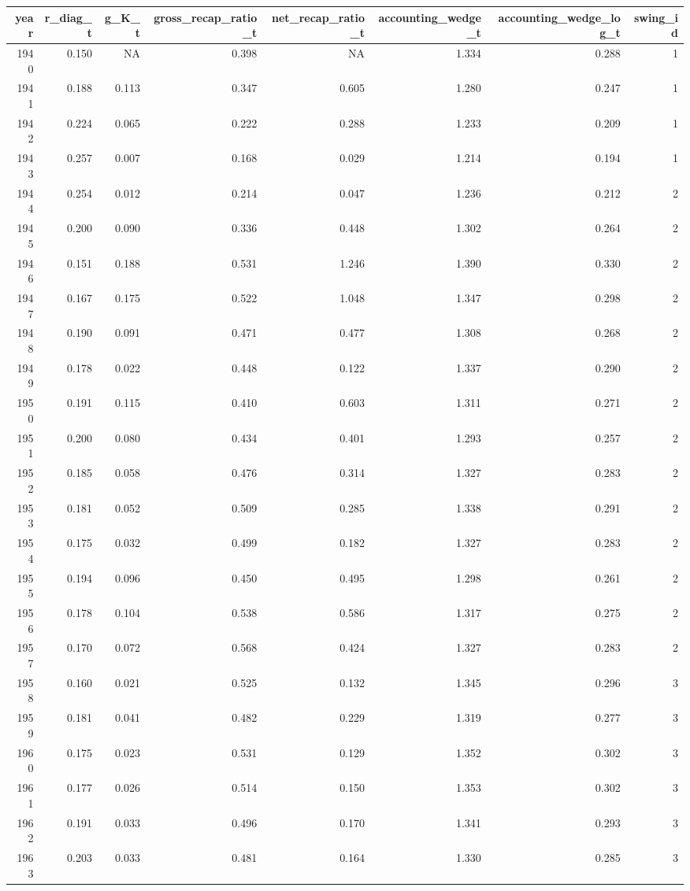 
\begin{longtable}{rrrrrrrr}
\toprule
year & r_diag_t & g_K_t & gross_recap_ratio_t & net_recap_ratio_t & accounting_wedge_t & accounting_wedge_log_t & swing_id\\
\midrule
1940 & 0.150 & NA & 0.398 & NA & 1.334 & 0.288 & 1\\
1941 & 0.188 & 0.113 & 0.347 & 0.605 & 1.280 & 0.247 & 1\\
1942 & 0.224 & 0.065 & 0.222 & 0.288 & 1.233 & 0.209 & 1\\
1943 & 0.257 & 0.007 & 0.168 & 0.029 & 1.214 & 0.194 & 1\\
1944 & 0.254 & 0.012 & 0.214 & 0.047 & 1.236 & 0.212 & 2\\
1945 & 0.200 & 0.090 & 0.336 & 0.448 & 1.302 & 0.264 & 2\\
1946 & 0.151 & 0.188 & 0.531 & 1.246 & 1.390 & 0.330 & 2\\
1947 & 0.167 & 0.175 & 0.522 & 1.048 & 1.347 & 0.298 & 2\\
1948 & 0.190 & 0.091 & 0.471 & 0.477 & 1.308 & 0.268 & 2\\
1949 & 0.178 & 0.022 & 0.448 & 0.122 & 1.337 & 0.290 & 2\\
1950 & 0.191 & 0.115 & 0.410 & 0.603 & 1.311 & 0.271 & 2\\
1951 & 0.200 & 0.080 & 0.434 & 0.401 & 1.293 & 0.257 & 2\\
1952 & 0.185 & 0.058 & 0.476 & 0.314 & 1.327 & 0.283 & 2\\
1953 & 0.181 & 0.052 & 0.509 & 0.285 & 1.338 & 0.291 & 2\\
1954 & 0.175 & 0.032 & 0.499 & 0.182 & 1.327 & 0.283 & 2\\
1955 & 0.194 & 0.096 & 0.450 & 0.495 & 1.298 & 0.261 & 2\\
1956 & 0.178 & 0.104 & 0.538 & 0.586 & 1.317 & 0.275 & 2\\
1957 & 0.170 & 0.072 & 0.568 & 0.424 & 1.327 & 0.283 & 2\\
1958 & 0.160 & 0.021 & 0.525 & 0.132 & 1.345 & 0.296 & 3\\
1959 & 0.181 & 0.041 & 0.482 & 0.229 & 1.319 & 0.277 & 3\\
1960 & 0.175 & 0.023 & 0.531 & 0.129 & 1.352 & 0.302 & 3\\
1961 & 0.177 & 0.026 & 0.514 & 0.150 & 1.353 & 0.302 & 3\\
1962 & 0.191 & 0.033 & 0.496 & 0.170 & 1.341 & 0.293 & 3\\
1963 & 0.203 & 0.033 & 0.481 & 0.164 & 1.330 & 0.285 & 3\\

\end{longtable}
